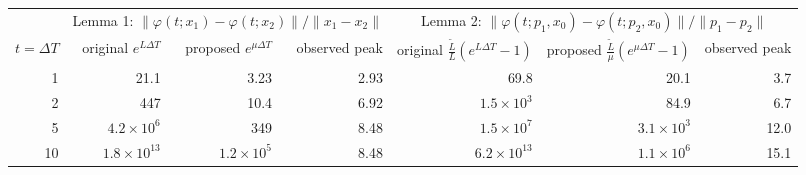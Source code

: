 \begin{tabular}{r rrr rrr}
\toprule
& \multicolumn{3}{c}{Lemma 1: $\lVert\varphi(t;x_1)-\varphi(t;x_2)\rVert/\lVert x_1-x_2\rVert$} & \multicolumn{3}{c}{Lemma 2: $\lVert\varphi(t;p_1,x_0)-\varphi(t;p_2,x_0)\rVert/\lVert p_1-p_2\rVert$}\\
\cmidrule(lr){2-4}\cmidrule(lr){5-7}
$t=\Delta T$ & original $e^{L\Delta T}$ & proposed $e^{\mu\Delta T}$ & observed peak & original $\frac{\tilde L}{L}(e^{L\Delta T}-1)$ & proposed $\frac{\tilde L}{\mu}(e^{\mu\Delta T}-1)$ & observed peak\\
\midrule
1 & 21.1 & 3.23 & 2.93 & 69.8 & 20.1 & 3.7 \\
2 & 447 & 10.4 & 6.92 & $1.5\times10^{3}$ & 84.9 & 6.7 \\
5 & $4.2\times10^{6}$ & 349 & 8.48 & $1.5\times10^{7}$ & $3.1\times10^{3}$ & 12.0 \\
10 & $1.8\times10^{13}$ & $1.2\times10^{5}$ & 8.48 & $6.2\times10^{13}$ & $1.1\times10^{6}$ & 15.1 \\
\bottomrule
\end{tabular}
